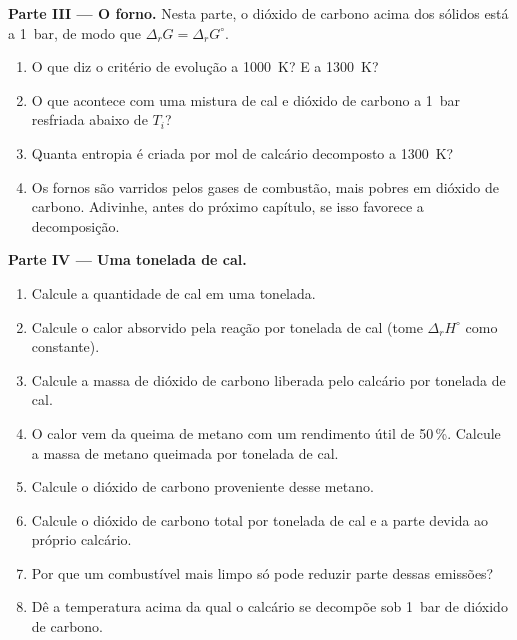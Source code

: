 \begin{problem}
\medskip
\noindent\textbf{Parte III --- O forno.}
Nesta parte, o dióxido de carbono acima dos sólidos está a \qty{1}{bar}, de
modo que $\Delta_r G = \Delta_r G^\circ$.
\begin{enumerate}[resume]
  \item O que diz o critério de evolução a \qty{1000}{K}? E a
        \qty{1300}{K}?
  \item O que acontece com uma mistura de cal e dióxido de carbono a
        \qty{1}{bar} resfriada abaixo de $T_i$?
  \item Quanta entropia é criada por mol de calcário decomposto a
        \qty{1300}{K}?
  \item Os fornos são varridos pelos gases de combustão, mais pobres em
        dióxido de carbono. Adivinhe, antes do próximo capítulo, se isso
        favorece a decomposição.
\end{enumerate}

\medskip
\noindent\textbf{Parte IV --- Uma tonelada de cal.}
\begin{enumerate}[resume]
  \item Calcule a quantidade de cal em uma tonelada.
  \item Calcule o calor absorvido pela reação por tonelada de cal
        (tome $\Delta_r H^\circ$ como constante).
  \item Calcule a massa de dióxido de carbono liberada pelo calcário por
        tonelada de cal.
  \item O calor vem da queima de metano com um rendimento útil de
        50\,\%. Calcule a massa de metano queimada por tonelada de cal.
  \item Calcule o dióxido de carbono proveniente desse metano.
  \item Calcule o dióxido de carbono total por tonelada de cal e a parte
        devida ao próprio calcário.
  \item Por que um combustível mais limpo só pode reduzir parte dessas emissões?
  \item Dê a temperatura acima da qual o calcário se decompõe sob
        \qty{1}{bar} de dióxido de carbono.
\end{enumerate}
\end{problem}
